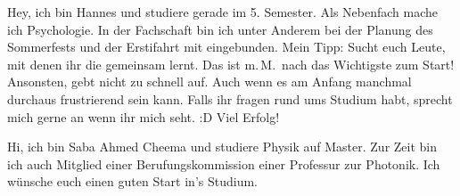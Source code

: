 \begin{multicols}{2}
{
Hey, ich bin Hannes und studiere gerade im 5. Semester. Als Nebenfach mache ich Psychologie. In der Fachschaft bin ich unter Anderem bei der Planung des Sommerfests und der Erstifahrt mit eingebunden. Mein Tipp: Sucht euch Leute, mit denen ihr die gemeinsam lernt. Das ist m.\,M.\ nach das Wichtigste zum Start! Ansonsten, gebt nicht zu schnell auf. Auch wenn es am Anfang manchmal durchaus frustrierend sein kann.
Falls ihr fragen rund ums Studium habt, sprecht mich gerne an wenn ihr mich seht. :D 
Viel Erfolg!
}

\vspace{-0.1cm}

{
Hi, ich bin Saba Ahmed Cheema und studiere Physik auf Master. Zur Zeit bin ich auch Mitglied einer Berufungskommission einer Professur zur Photonik. Ich wünsche euch einen guten Start in's Studium. 
}


\end{multicols}
